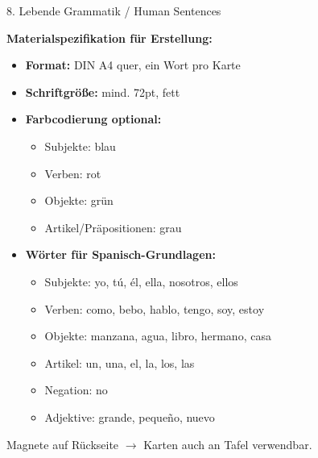 \documentclass[11pt, a4paper]{article}
\begin{document}
\begin{methode}{8. Lebende Grammatik / Human Sentences}
\begin{materialbox}
\textbf{Materialspezifikation für Erstellung:}
\begin{itemize}[leftmargin=*]
    \item \textbf{Format:} DIN A4 quer, ein Wort pro Karte
    \item \textbf{Schriftgröße:} mind. 72pt, fett
    \item \textbf{Farbcodierung optional:}
    \begin{itemize}
        \item Subjekte: blau
        \item Verben: rot
        \item Objekte: grün
        \item Artikel/Präpositionen: grau
    \end{itemize}
    \item \textbf{Wörter für Spanisch-Grundlagen:}
    \begin{itemize}
        \item Subjekte: yo, tú, él, ella, nosotros, ellos
        \item Verben: como, bebo, hablo, tengo, soy, estoy
        \item Objekte: manzana, agua, libro, hermano, casa
        \item Artikel: un, una, el, la, los, las
        \item Negation: no
        \item Adjektive: grande, pequeño, nuevo
    \end{itemize}
\end{itemize}
\end{materialbox}

\begin{tipp}
Magnete auf Rückseite $\rightarrow$ Karten auch an Tafel verwendbar.
\end{tipp}

\end{methode}

\vspace{1em}
\end{document}
